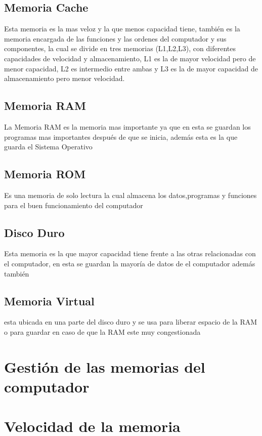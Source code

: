 \documentclass{article}
\begin{document}
	\subsection{Memoria Cache}
	Esta memoria es la mas veloz y la que menos capacidad tiene, también es la memoria encargada de las funciones y las ordenes del computador y sus componentes, la cual se divide en tres memorias (L1,L2,L3), con diferentes capacidades de velocidad y almacenamiento, L1 es la de mayor velocidad pero de menor capacidad, L2 es intermedio entre ambas y L3 es la de mayor capacidad de almacenamiento pero menor velocidad.
	
	\subsection{Memoria RAM}
	La Memoria RAM es la memoria mas importante ya que en esta se guardan los programas mas importantes después de que se inicia, además esta es la que guarda el Sistema Operativo
	
	\subsection{Memoria ROM}
	Es una memoria de solo lectura la cual almacena los datos,programas y funciones para el buen funcionamiento del computador
	
	\subsection{Disco Duro}
	Esta memoria es la que mayor capacidad tiene frente a las otras relacionadas con el computador, en esta se guardan la mayoría de datos de el computador además también 
	
	\subsection{Memoria Virtual}
	esta ubicada en una parte del disco duro y se usa para liberar espacio de la RAM o para guardar en caso de que la RAM este muy congestionada
	
	\section{Gestión de las memorias del computador}
	
	\section{Velocidad de la memoria}
	
	
	
	
\end{document}
